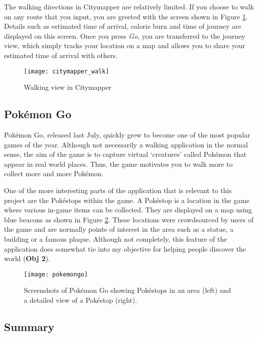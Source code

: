 The walking directions in Citymapper are relatively limited. If you choose to walk on any route that you input, you are greeted with the screen shown in Figure \ref{fig:citymapper-walk}. Details such as estimated time of arrival, calorie burn and time of journey are displayed on this screen. Once you press \textit{Go}, you are transferred to the journey view, which simply tracks your location on a map and allows you to share your estimated time of arrival with others.

\begin{figure}[hbt]
  \centering
  \texttt{[image: citymapper\_walk]}
  \caption{Walking view in Citymapper}
  \label{fig:citymapper-walk}
\end{figure}

\subsection{Pok\'{e}mon Go} \label{subsection:pokemongo}

Pok\'{e}mon Go, released last July, quickly grew to become one of the most popular games of the year. Although not necessarily a walking application in the normal sense, the aim of the game is to capture virtual `creatures' called Pok\'{e}mon that appear in real world places. Thus, the game motivates you to walk more to collect more and more Pok\'{e}mon.

One of the more interesting parts of the application that is relevant to this project are the Pok\'{e}stops within the game. A Pok\'{e}stop is a location in the game where various in-game items can be collected. They are displayed on a map using blue beacons as shown in Figure \ref{fig:pokemongo}. These locations were crowdsourced by users of the game and are normally points of interest in the area such as a statue, a building or a famous plaque. Although not completely, this feature of the application does somewhat tie into my objective for helping people discover the world (\textbf{Obj 2}).

\begin{figure}[hbt]
  \centering
  \texttt{[image: pokemongo]}
  \caption{Screenshots of Pok\'{e}mon Go showing Pok\'{e}stops in an area (left) and a detailed view of a Pok\'{e}stop (right).}
  \label{fig:pokemongo}
\end{figure}

\subsection{Summary}

